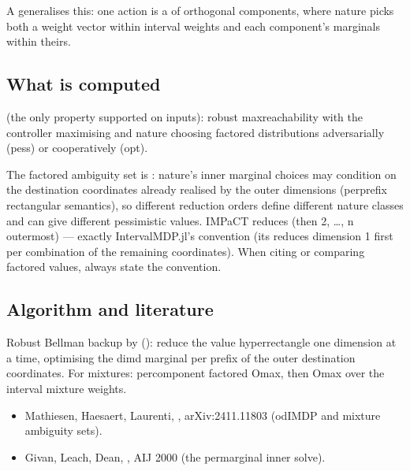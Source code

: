 \documentclass[a4paper,10pt,english]{sphinxmanual}
\begin{document}
\sphinxAtStartPar
A  generalises this: one action is a  of orthogonal
components, where nature picks both a weight vector within interval weights and each
component’s marginals within theirs.


\subsection{What is computed}
\label{\detokenize{manual/odimdp:what-is-computed}}
\sphinxAtStartPar
{} (the only property supported on  inputs): robust max\sphinxhyphen{}reachability with
the controller maximising and nature choosing factored distributions adversarially
(pess) or cooperatively (opt).

\sphinxAtStartPar
{} The factored ambiguity set is
: nature’s inner marginal choices may condition on the
destination coordinates already realised by the outer dimensions (per\sphinxhyphen{}prefix
rectangular semantics), so different reduction orders define different nature classes
and can give different pessimistic values. IMPaCT reduces 
(then 2, …, n outermost) — exactly IntervalMDP.jl’s convention (its
 reduces dimension 1 first per combination of the remaining
coordinates). When citing or comparing factored values, always state the convention.


\subsection{Algorithm and literature}
\label{\detokenize{manual/odimdp:algorithm-and-literature}}
\sphinxAtStartPar
Robust Bellman backup by 
(): reduce the value hyper\sphinxhyphen{}rectangle one dimension at a time,
optimising the dim\sphinxhyphen{}d marginal per prefix of the outer destination coordinates. For
mixtures: per\sphinxhyphen{}component factored O\sphinxhyphen{}max, then O\sphinxhyphen{}max over the interval mixture weights.
\begin{itemize}
\item {} 
\sphinxAtStartPar
Mathiesen, Haesaert, Laurenti, , arXiv:2411.11803 (odIMDP and mixture ambiguity
sets).

\item {} 
\sphinxAtStartPar
Givan, Leach, Dean, , AIJ 2000 (the per\sphinxhyphen{}marginal inner
solve).

\end{itemize}
\end{document}
